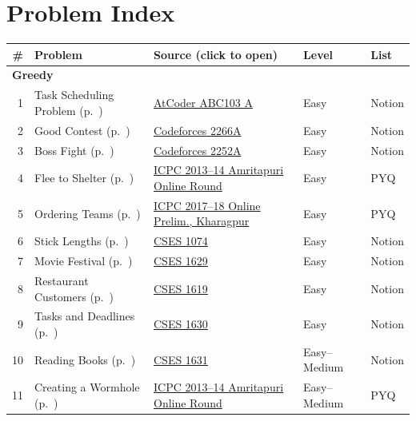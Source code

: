 \section*{Problem Index}
{\small
\begin{longtable}{r >{\raggedright\arraybackslash}p{4.6cm} >{\raggedright\arraybackslash}p{5.6cm} l l}
\toprule
\# & \textbf{Problem} & \textbf{Source (click to open)} & \textbf{Level} & \textbf{List}\\
\midrule
\endhead
\multicolumn{5}{l}{\textbf{Greedy}}\\
1 & Task Scheduling Problem (p.~\pageref{sec:g-task-scheduling}) & \href{https://atcoder.jp/contests/abc103/tasks/abc103_a}{AtCoder ABC103 A} & Easy & Notion\\
2 & Good Contest (p.~\pageref{sec:g-good-contest}) & \href{https://codeforces.com/problemset/problem/2266/A}{Codeforces 2266A} & Easy & Notion\\
3 & Boss Fight (p.~\pageref{sec:g-boss-fight}) & \href{https://codeforces.com/problemset/problem/2252/A}{Codeforces 2252A} & Easy & Notion\\
4 & Flee to Shelter (p.~\pageref{sec:g-flee}) & \href{https://github.com/m-e-r-l-i-n/icpc-india/blob/main/src/2013amritapuri_online.pdf}{ICPC 2013--14 Amritapuri Online Round} & Easy & PYQ\\
5 & Ordering Teams (p.~\pageref{sec:g-ordering-teams}) & \href{https://www.codechef.com/problems/ORDTEAMS}{ICPC 2017--18 Online Prelim., Kharagpur} & Easy & PYQ\\
6 & Stick Lengths (p.~\pageref{sec:g-stick-lengths}) & \href{https://cses.fi/problemset/task/1074}{CSES 1074} & Easy & Notion\\
7 & Movie Festival (p.~\pageref{sec:g-movie}) & \href{https://cses.fi/problemset/task/1629}{CSES 1629} & Easy & Notion\\
8 & Restaurant Customers (p.~\pageref{sec:g-restaurant}) & \href{https://cses.fi/problemset/task/1619}{CSES 1619} & Easy & Notion\\
9 & Tasks and Deadlines (p.~\pageref{sec:g-tasks-deadlines}) & \href{https://cses.fi/problemset/task/1630}{CSES 1630} & Easy & Notion\\
10 & Reading Books (p.~\pageref{sec:g-reading-books}) & \href{https://cses.fi/problemset/task/1631}{CSES 1631} & Easy--Medium & Notion\\
11 & Creating a Wormhole (p.~\pageref{sec:g-wormhole}) & \href{https://github.com/m-e-r-l-i-n/icpc-india/blob/main/src/2013amritapuri_online.pdf}{ICPC 2013--14 Amritapuri Online Round} & Easy--Medium & PYQ\\

\end{longtable}}

